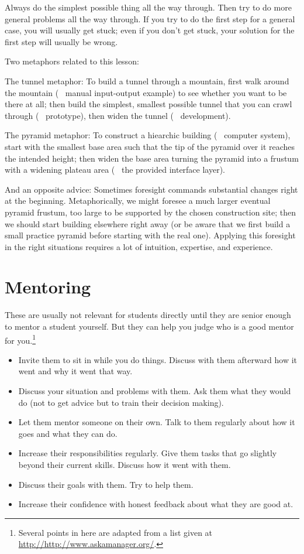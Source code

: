 \documentclass[12pt]{article}
\begin{document}
Always do the simplest possible thing all the way through.
Then try to do more general problems all the way through.
If you try to do the first step for a general case, you will usually get stuck; even if you don't get stuck, your solution for the first step will usually be wrong.

Two metaphors related to this lesson:
\begin{compactitem}
\item The tunnel metaphor: To build a tunnel through a mountain, first walk around the mountain (~ manual input-output example) to see whether you want to be there at all; then build the simplest, smallest possible tunnel that you can crawl through (~ prototype), then widen the tunnel (~ development).
\item The pyramid metaphor: To construct a hiearchic building (~ computer system), start with the smallest base area such that the tip of the pyramid over it reaches the intended height; then widen the base area turning the pyramid into a frustum with a widening plateau area (~ the provided interface layer).
\end{compactitem}

And an opposite advice: Sometimes foresight commands substantial changes right at the beginning.
Metaphorically, we might foresee a much larger eventual pyramid frustum, too large to be supported by the chosen construction site; then we should start building elsewhere right away (or be aware that we first build a small practice pyramid before starting with the real one).
Applying this foresight in the right situations requires a lot of intuition, expertise, and experience.

\section{Mentoring}

These are usually not relevant for students directly until they are senior enough to mentor a student yourself.
But they can help you judge who is a good mentor for you.\footnote{Several points in here are adapted from a list given at \url{http://http://www.askamanager.org/}.}

\begin{itemize}
\item Invite them to sit in while you do things. Discuss with them afterward how it went and why it went that way.
\item Discuss your situation and problems with them. Ask them what they would do (not to get advice but to train their decision making).
\item Let them mentor someone on their own. Talk to them regularly about how it goes and what they can do.
\item Increase their responsibilities regularly. Give them tasks that go slightly beyond their current skills. Discuss how it went with them.
\item Discuss their goals with them. Try to help them.
\item Increase their confidence with honest feedback about what they are good at.
\end{itemize}
\end{document}
